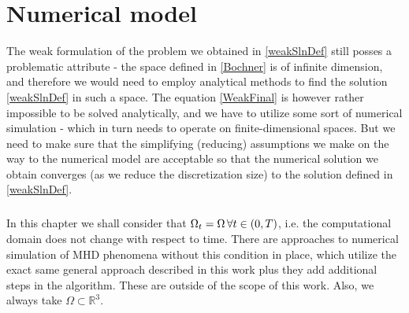 \chapter{Numerical model}
The weak formulation of the problem we obtained in \ref{weakSlnDef} still posses a problematic attribute - the space defined in \ref{Bochner} is of infinite dimension, and therefore we would need to employ analytical methods to find the solution \ref{weakSlnDef} in such a space. The equation \ref{WeakFinal} is however rather impossible to be solved analytically, and we have to utilize some sort of numerical simulation - which in turn needs to operate on finite-dimensional spaces. But we need to make sure that the simplifying (reducing) assumptions we make on the way to the numerical model are acceptable so that the numerical solution we obtain converges (as we reduce the discretization size) to the solution defined in \ref{weakSlnDef}.

\paragraph{}
In this chapter we shall consider that $\Omega_t = \Omega\, \forall t \in \left( 0, T\right) $, i.e. the computational domain does not change with respect to time. There are approaches to numerical simulation of MHD phenomena without this condition in place, which utilize the exact same general approach described in this work plus they add additional steps in the algorithm. These are outside of the scope of this work. Also, we always take $\Omega \subset \mathbb{R}^3$.











